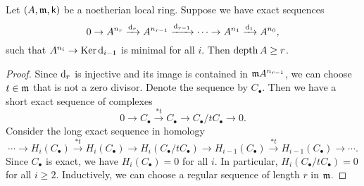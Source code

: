     \begin{lemma}\label{lem: finite minimal projective resolution and depth}
        Let \((A,{\mathfrak{m}},{\mathsf{k}})\) be a noetherian local ring.
        Suppose we have exact sequences
        \[ 0 \to A^{n_r} \xrightarrow{{\mathrm{d}}_r} A^{n_{r-1}} \xrightarrow{{\mathrm{d}}_{r-1}} \cdots \to A^{n_1} \xrightarrow{{\mathrm{d}}_1} A^{n_0}, \]
        such that \( A^{n_i} \to \operatorname{Ker} {\mathrm{d}}_{i-1} \) is minimal for all \(i\).
        Then \(\operatorname{depth} A \geq r\).
    \end{lemma}
    \begin{proof}
        Since \({\mathrm{d}}_r\) is injective and its image is contained in \({\mathfrak{m}} A^{n_{r-1}}\), we can choose \(t \in {\mathfrak{m}}\) that is not a zero divisor.
        Denote the sequence by \(C_\bullet\).
        Then we have a short exact sequence of complexes
        \[ 0 \to C_\bullet \xrightarrow{*t} C_\bullet \to C_\bullet/tC_\bullet \to 0. \]
        Consider the long exact sequence in homology
        \[ \cdots \to H_{i}(C_\bullet) \xrightarrow{*t} H_i(C_\bullet) \to H_i(C_\bullet/tC_\bullet) \to H_{i-1}(C_\bullet) \xrightarrow{*t} H_{i-1}(C_\bullet) \to \cdots. \]
        Since \(C_\bullet\) is exact, we have \(H_i(C_\bullet) = 0\) for all \(i\).
        In particular, \(H_i(C_\bullet/tC_\bullet) = 0\) for all \(i\geq 2\).
        Inductively, we can choose a regular sequence of length \(r\) in \({\mathfrak{m}}\).
    \end{proof}


